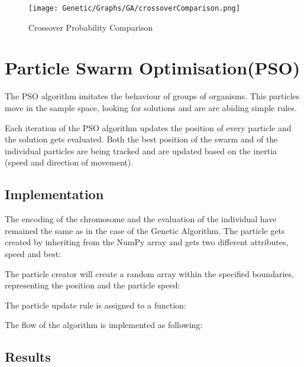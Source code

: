 \documentclass{report}
\begin{document}
\begin{center}
\begin{figure}[htp]
\texttt{[image: Genetic/Graphs/GA/crossoverComparison.png]}
\caption{Crossover Probability Comparison}
\label{crossover}
\end{figure}
\end{center}



\newpage
\section{Particle Swarm Optimisation(PSO)}

The PSO algorithm imitates the behaviour of groups of organisms. This particles move in the sample space, looking for solutions and are are abiding simple rules.

Each iteration of the PSO algorithm updates the position of every particle and the solution gets evaluated. Both the best position of the swarm and of the individual particles are being tracked and are updated based on the inertia (speed and direction of movement).



\subsection{Implementation}
The encoding of the chromosome and the evaluation of the individual have remained the same as in the case of the Genetic Algorithm. The particle gets created by inheriting from the NumPy array and gets two different attributes, speed and best:



The particle creator will create a random array within the specified boundaries, representing the position and the particle speed:



The particle update rule is assigned to a function:




The flow of the algorithm is implemented as following:


\newpage
\subsection{Results}
\end{document}
